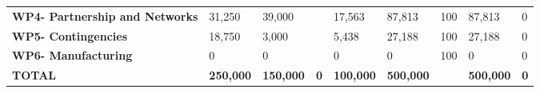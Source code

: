 \begin{table}[H]
{\begin{tabular}{p{5cm}p{2cm}p{2cm}p{2.5cm}p{2cm}p{2cm}p{2cm}p{2cm}p{2cm}}
\textbf{WP4- Partnership and Networks} & 31,250                                                                 & 39,000                                                             &                                                                                 & 17,563                                                                       & 87,813                                                                                        & 100                        & 87,813                          & 0                                                                         \\
\textbf{WP5- Contingencies}                                                        & 18,750                                                                 & 3,000                                                              &                                                                                 & 5,438                                                                        & 27,188                                                                                        & 100                        & 27,188                          & 0                                                                         \\
\textbf{WP6- Manufacturing}                                                        & 0                                                                      & 0                                                                  &                                                                                 & 0                                                                            & 0                                                                                             & 100                        & 0                               & 0                                                                         \\ \hline
\textbf{TOTAL}                                                                     & \textbf{250,000}                                                       & \textbf{150,000}                                                   & \textbf{0}                                                                      & \textbf{100,000}                                                             & \textbf{500,000}                                                                              & \textbf{}                    & \textbf{500,000}                & \textbf{0}                                                               
\\ \bottomrule[2pt]
\end{tabular} }
\end{table}


